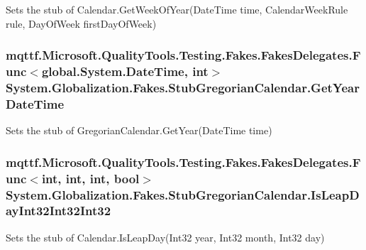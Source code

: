 Sets the stub of Calendar.\-Get\-Week\-Of\-Year(\-Date\-Time time, Calendar\-Week\-Rule rule, Day\-Of\-Week first\-Day\-Of\-Week)

\hypertarget{class_system_1_1_globalization_1_1_fakes_1_1_stub_gregorian_calendar_afd53ffc3f84478039ff2576e53b0410d}{
\subsubsection[{Get\-Year\-Date\-Time}]{\setlength{\rightskip}{0pt plus 5cm}mqttf.\-Microsoft.\-Quality\-Tools.\-Testing.\-Fakes.\-Fakes\-Delegates.\-Func$<$global.\-System.\-Date\-Time, int$>$ System.\-Globalization.\-Fakes.\-Stub\-Gregorian\-Calendar.\-Get\-Year\-Date\-Time}}\label{class_system_1_1_globalization_1_1_fakes_1_1_stub_gregorian_calendar_afd53ffc3f84478039ff2576e53b0410d}


Sets the stub of Gregorian\-Calendar.\-Get\-Year(\-Date\-Time time)

\hypertarget{class_system_1_1_globalization_1_1_fakes_1_1_stub_gregorian_calendar_abc53c511f074336d802e309bc02d5279}{
\subsubsection[{Is\-Leap\-Day\-Int32\-Int32\-Int32}]{\setlength{\rightskip}{0pt plus 5cm}mqttf.\-Microsoft.\-Quality\-Tools.\-Testing.\-Fakes.\-Fakes\-Delegates.\-Func$<$int, int, int, bool$>$ System.\-Globalization.\-Fakes.\-Stub\-Gregorian\-Calendar.\-Is\-Leap\-Day\-Int32\-Int32\-Int32}}\label{class_system_1_1_globalization_1_1_fakes_1_1_stub_gregorian_calendar_abc53c511f074336d802e309bc02d5279}


Sets the stub of Calendar.\-Is\-Leap\-Day(\-Int32 year, Int32 month, Int32 day)

